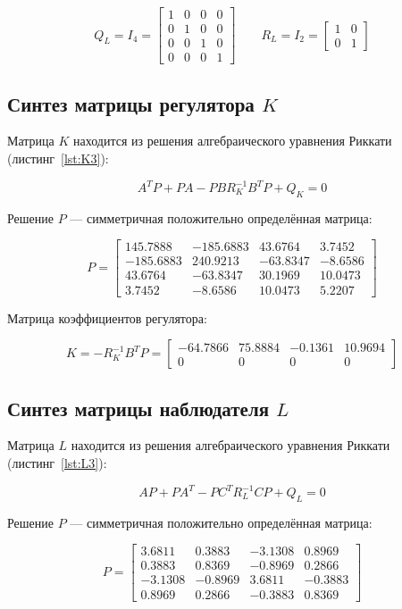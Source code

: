 \documentclass[a4paper,12pt]{article}
\begin{document}
\[
Q_L = I_4 =
\begin{bmatrix}
	1 & 0 & 0 & 0 \\
	0 & 1 & 0 & 0 \\
	0 & 0 & 1 & 0 \\
	0 & 0 & 0 & 1
\end{bmatrix} \qquad
R_L = I_2 =
\begin{bmatrix}
	1 & 0 \\
	0 & 1
\end{bmatrix}
\]

	
\subsection{Синтез матрицы регулятора $K$}

Матрица $K$ находится из решения алгебраического уравнения Риккати (листинг~\ref{lst:K3}):

\[
A^T P + P A - P B R_K^{-1} B^T P + Q_K = 0
\]

Решение $P$ --- симметричная положительно определённая матрица:

\[
P = 
\begin{bmatrix}
	145.7888 & -185.6883 & 43.6764 & 3.7452 \\
	-185.6883 & 240.9213 & -63.8347 & -8.6586 \\
	43.6764 & -63.8347 & 30.1969 & 10.0473 \\
	3.7452 & -8.6586 & 10.0473 & 5.2207
\end{bmatrix}
\]

Матрица коэффициентов регулятора:

\[
K = -R_K^{-1} B^T P =
\begin{bmatrix}
	-64.7866 & 75.8884 & -0.1361 & 10.9694 \\
	0 & 0 & 0 & 0
\end{bmatrix}
\]
	
\subsection{Синтез матрицы наблюдателя $L$}

Матрица $L$ находится из решения алгебраического уравнения Риккати (листинг~\ref{lst:L3}):

\[
A P + P A^T - P C^T R_L^{-1} C P + Q_L = 0
\]

Решение $P$ --- симметричная положительно определённая матрица:

\[
P = 
\begin{bmatrix}
	3.6811 & 0.3883 & -3.1308 & 0.8969 \\
	0.3883 & 0.8369 & -0.8969 & 0.2866 \\
	-3.1308 & -0.8969 & 3.6811 & -0.3883 \\
	0.8969 & 0.2866 & -0.3883 & 0.8369
\end{bmatrix}
\]
\end{document}
